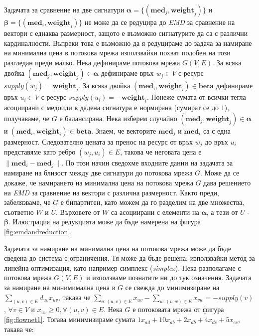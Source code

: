 \documentclass[a4paper,12pt]{article}
\begin{document}
\bigbreak

Задачата за сравнение на две сигнатури $\mathbf{\alpha} = \{(\mathbf{med}_j, \mathbf{weight}_j)\}$ и $\mathbf{\beta} = \{(\mathbf{med}_i, \mathbf{weight}_i)\}$ не може да се редуцира до \textit{EMD} за сравнение на вектори с еднаква размерност, защото е възможно сигнатурите да са с различни кардиналности. Въпреки това е възможно да я редуцираме до задача за намиране на минимална цена в потокова мрежа използвайки похват подобен на този разгледан преди малко. Нека дефинираме потокова мрежа $G(V, E)$. За всяка двойка $(\mathbf{med}_j, \mathbf{weight}_j) \in \mathbf{\alpha}$ дефинираме връх $w_j \in V$ с ресурс $supply(w_j) = \mathbf{weight}_j$. За всяка двойка $(\mathbf{med}_i, \mathbf{weight}_i) \in \mathbf{beta}$ дефинираме връх $u_i \in V$ с ресурс $supply(u_i) = -\mathbf{weight}_i$. Понеже сумата от всички тегла асоциирани с медоиди в дадена сигнатура е нормирана (сумират се до $1$), получаваме, че $G$ е балансирана. Нека изберем случайно $(\mathbf{med}_j, \mathbf{weight}_j) \in \mathbf{\alpha}$ и $(\mathbf{med}_i, \mathbf{weight}_i) \in \mathbf{beta}$. Знаем, че векторите $\mathbf{med}_j$ и $\mathbf{med}_i$ са с една размерност. Следователно цената за пренос на ресурс от връх $w_j$ до връх $u_i$ представяме като ребро $(w_j, u_i) \in E$, такова че неговата цена е $\lVert \mathbf{med}_i - \mathbf{med}_j \rVert$. По този начин сведохме входните данни на задачата за намиране на близост между две сигнатури до потокова мрежа $G$. Може да се докаже, че намирането на минимална цена на потокова мрежа $G$ дава решението на \textit{EMD} за сравнение на вектори с различна размерност. Както преди, забелязваме, че $G$ е бипартитен, като можем да го разделим на две множества, съответно $W$ и $U$. Върховете от $W$ са асоциирани с елементи на $\mathbf{\alpha}$, а тези от $U$ - $\mathbf{\beta}$.  Илюстрация на редукцията може да бъде намерена на фигура \ref{fig:emdandreduction}.

\bigbreak

Задачата за намиране на минимална цена на потокова мрежа може да бъде сведена до система с ограничения. Тя може да бъде решена, използвайки метод за линейна оптимизация, като например симплекс (\textit{simplex}). Нека разполагаме с потокова мрежа $G(V, E)$ и използваме познатите ни до тук означения. Задачата за намиране на минимимална цена в $G$ се свежда до минимизиране на $\sum_{(u,v) \in E} d_{uv} x_{uv}$, такава че $\sum_{u: (u, v) \in E} x_{uv} - \sum_{w: (v, w) \in E} x_{vw} = -supply(v)$, $\forall v \in V$ и $x_{uv} \geq 0, \forall (u, v) \in E$. Нека $G$ е потоковата мрежа от фигура \ref{fig:flownet1}. Тогава минимизираме сумата $1 x_{ad} + 10 x_{ab} + 2 x_{db} + 4 x_{de} + 5 x_{ec}$, такава че:
\end{document}
